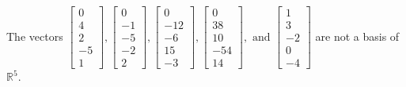 \begin{exercise}
\begin{exerciseStatement}
  \end{exerciseStatement}
  \begin{exerciseAnswer}
   The vectors \(\left[\begin{array}{r}
0 \\
4 \\
2 \\
-5 \\
1
\end{array}\right] , \left[\begin{array}{r}
0 \\
-1 \\
-5 \\
-2 \\
2
\end{array}\right] , \left[\begin{array}{r}
0 \\
-12 \\
-6 \\
15 \\
-3
\end{array}\right] , \left[\begin{array}{r}
0 \\
38 \\
10 \\
-54 \\
14
\end{array}\right] , \text{ and } \left[\begin{array}{r}
1 \\
3 \\
-2 \\
0 \\
-4
\end{array}\right]\) 
  	 are not  a basis of \(\mathbb{R}^5\).
  


  \end{exerciseAnswer}
\end{exercise}